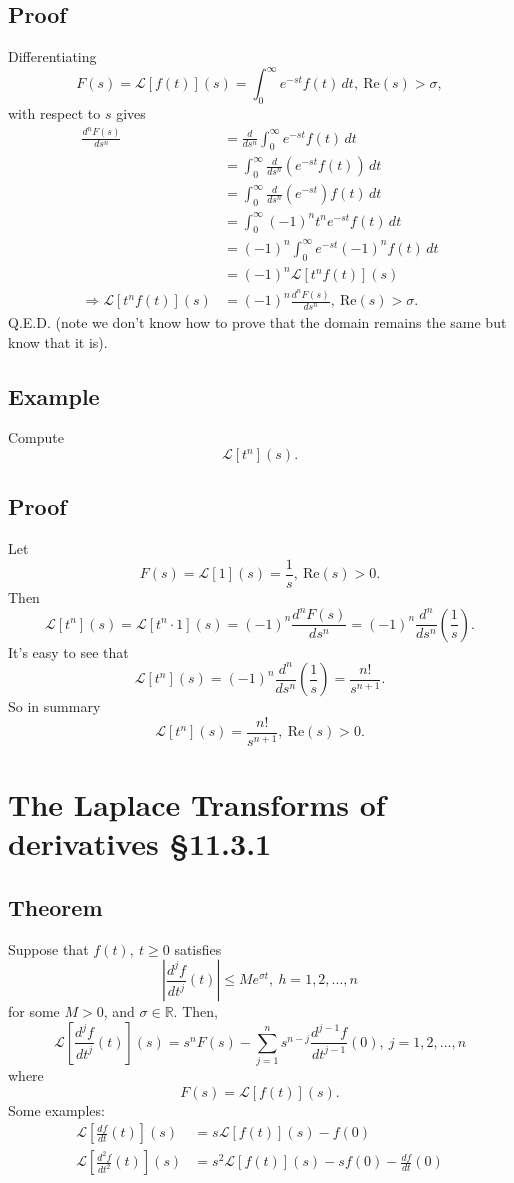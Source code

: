 \documentclass[11pt]{article}
\newcommand{\reals}{\mathbb{R}}
\newcommand{\Laplace}{\mathscr{L}}
\begin{document}
\subsection{Proof}
Differentiating
\[ F(s) = \Laplace[f(t)](s) = \int_0^\infty e^{-st}f(t)\, dt,\ \text{Re}(s) > \sigma, \]
with respect to $s$ gives
\begin{align*}
\frac{d^n F(s)}{ds^n} &= \frac{d}{ds^n} \int_0^\infty e^{-st}f(t)\, dt \\
&= \int_0^\infty \frac{d}{ds^n} \left( e^{-st}f(t) \right) \, dt \\
&= \int_0^\infty \frac{d}{ds^n} \left( e^{-st} \right) f(t)  \, dt \\
&= \int_0^\infty (-1)^n t^n  e^{-st} f(t)  \, dt \\
&= (-1)^n \int_0^\infty e^{-st} (-1)^n f(t)  \, dt \\
&= (-1)^n \Laplace[t^n f(t)](s) \\
\Rightarrow \Laplace[t^n f(t)](s) &= (-1)^n \frac{d^n F(s)}{ds^n},\ \text{Re}(s) > \sigma.
\end{align*}
Q.E.D. (note we don't know how to prove that the domain remains the same but know that it is).

\subsection{Example}
Compute
\[ \Laplace[t^n](s). \]

\subsection*{Proof}
Let
\[ F(s) = \Laplace[1](s) = \frac{1}{s},\ \text{Re}(s) > 0. \]
Then
\[ \Laplace[t^n](s) = \Laplace[t^n \cdot 1](s) = (-1)^n \frac{d^nF(s)}{ds^n} = (-1)^n \frac{d^n}{ds^n} \left( \frac{1}{s} \right). \]
It's easy to see that
\[ \Laplace[t^n](s) = (-1)^n \frac{d^n}{ds^n}\left( \frac{1}{s} \right) = \frac{n!}{s^{n+1}}. \]
So in summary
\[ \Laplace[t^n](s) = \frac{n!}{s^{n+1}},\ \text{Re}(s) > 0. \]

\section{The Laplace Transforms of derivatives §11.3.1}
\subsection{Theorem}
Suppose that $f(t),\ t \geq 0$ satisfies 
\[ \left| \frac{d^jf}{dt^j}(t) \right| \leq Me^{\sigma t},\ h=1,2,...,n \]
for some $M > 0$, and $\sigma \in \reals$. Then,
\[ \Laplace \left[ \frac{d^jf}{dt^j}(t) \right](s) = s^n F(s) - \sum_{j=1}^n s^{n-j}\frac{d^{j-1}f}{dt^{j-1}}(0),\ j=1, 2,..., n \]
where
\[ F(s) = \Laplace[f(t)](s). \]
Some examples:
\begin{align*}
\Laplace \left[ \frac{df}{dt}(t) \right](s) &= s \Laplace[f(t)](s) - f(0) \\
\Laplace \left[ \frac{d^2f}{dt^2}(t) \right](s) &= s^2 \Laplace[f(t)](s) - s f(0) - \frac{df}{dt}(0)
\end{align*}
\end{document}
